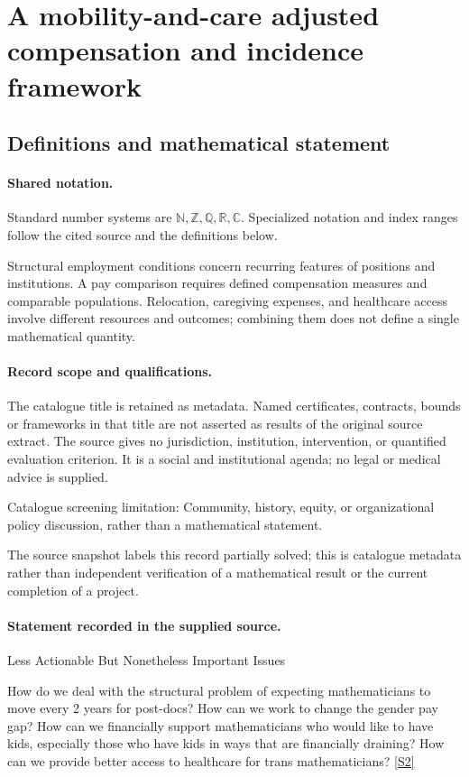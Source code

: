 \documentclass[11pt]{article}
\newcommand{\sref}[2]{\hyperlink{source:#1:#2}{[S#2]}}
\begin{document}
\section{A mobility-and-care adjusted compensation and incidence framework}\label{statement}

\subsection{Definitions and mathematical statement}

\paragraph{Shared notation.}Standard number systems are $\mathbb N,\mathbb Z,\mathbb Q,\mathbb R,\mathbb C$. Specialized notation and index ranges follow the cited source and the definitions below.


Structural employment conditions concern recurring features of positions and institutions. A pay comparison requires defined compensation measures and comparable populations. Relocation, caregiving expenses, and healthcare access involve different resources and outcomes; combining them does not define a single mathematical quantity.
\paragraph{Record scope and qualifications.}
The catalogue title is retained as metadata. Named certificates, contracts, bounds or frameworks in that title are not asserted as results of the original source extract.
The source gives no jurisdiction, institution, intervention, or quantified evaluation criterion. It is a social and institutional agenda; no legal or medical advice is supplied.

Catalogue screening limitation: Community, history, equity, or organizational policy discussion, rather than a mathematical statement.

The source snapshot labels this record partially solved; this is catalogue metadata rather than independent verification of a mathematical result or the current completion of a project.
\paragraph{Statement recorded in the supplied source.}
Less Actionable But Nonetheless Important Issues

How do we deal with the structural problem of expecting mathematicians to move every 2 years for post-docs? How can we work to change the gender pay gap? How can we financially support mathematicians who would like to have kids, especially those who have kids in ways that are financially draining? How can we provide better access to healthcare for trans mathematicians? \sref{statement}{2}
\end{document}
